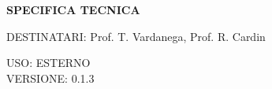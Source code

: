 \documentclass[5pt]{article}
\begin{document}
	\vspace{24pt}
	
	\begin{center}
		\textbf{\LARGE SPECIFICA TECNICA}
	\end{center}
	
	\vspace{13pt}
	
	\begin{flushleft}
		\begin{spacing}{1.5}
			DESTINATARI: Prof. T. Vardanega, Prof. R. Cardin\\%
		\end{spacing}
	\end{flushleft}
	
	\begin{flushright}
		\begin{spacing}{1}
			USO: ESTERNO\\
			VERSIONE: 0.1.3\\
		\end{spacing}
	\end{flushright}
	
	
	\restoregeometry
	
	\pagebreak
	
\end{document}
